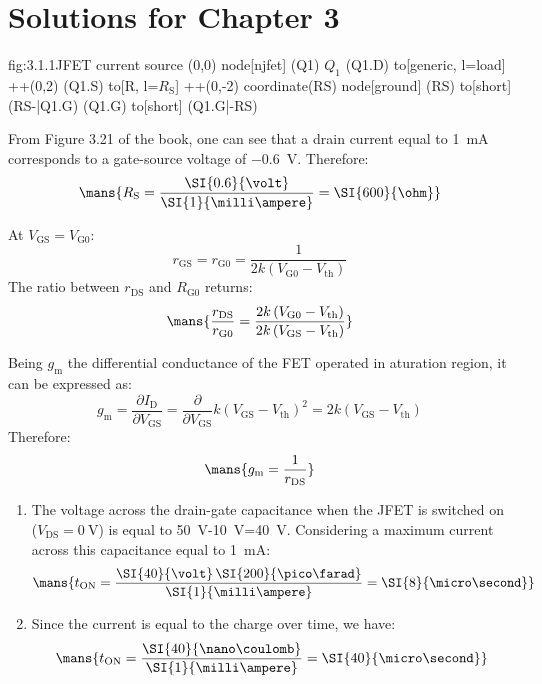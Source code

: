 \chapter{Solutions for Chapter 3}

\begin{circuit}{fig:3.1.1}{JFET current source}
    (0,0) node[njfet] (Q1) {$Q_1$}
    (Q1.D) to[generic, l=load] ++(0,2)
    (Q1.S) to[R, l=$R_\text{S}$] ++(0,-2) coordinate(RS)
    node[ground] {}
    (RS) to[short] (RS-|Q1.G)
    (Q1.G) to[short] (Q1.G|-RS)

\end{circuit}

From Figure 3.21 of the book, one can see that a drain current equal to \SI{1}{\milli\ampere} corresponds to a gate-source voltage of \SI{-0.6}{\volt}.
Therefore:
\[\mans{R_\text{S}=\frac{\SI{0.6}{\volt}}{\SI{1}{\milli\ampere}}=\SI{600}{\ohm}}\]

At $V_\text{GS}=V_\text{G0}$:
\[r_\text{GS}=r_\text{G0}=\frac{1}{2k\left(V_\text{G0}-V_\text{th}\right)}\]
The ratio between $r_\text{DS}$ and $R_\text{G0}$ returns:
\[\mans{\frac{r_\text{DS}}{r_\text{G0}}=\frac{2k\left(V_\text{G0}-V_\text{th}\right)}{2k\left(V_\text{GS}-V_\text{th}\right)}}\]

Being $g_\text{m}$ the differential conductance of the FET operated in aturation region, it can be expressed as:
\[g_\text{m}=\frac{\partial I_\text{D}}{\partial V_\text{GS}}=\frac{\partial}{\partial V_\text{GS}}k\left(V_\text{GS}-V_\text{th}\right)^2=2k\left(V_\text{GS}-V_\text{th}\right)\]
Therefore:
\[\mans{g_\text{m}=\frac{1}{r_\text{DS}}}\]

\begin{enumerate}
    \item The voltage across the drain-gate capacitance when the JFET is switched on ($V_\text{DS}=\SI{0}{\volt}$) is equal to \SI{50}{\volt}-\SI{10}{\volt}=\SI{40}{\volt}. Considering a maximum current across this capacitance equal to \SI{1}{\milli\ampere}:
    \[\mans{t_\text{ON}=\frac{\SI{40}{\volt}\,\SI{200}{\pico\farad}}{\SI{1}{\milli\ampere}}=\SI{8}{\micro\second}}\]
    \item Since the current is equal to the charge over time, we have:
    \[\mans{t_\text{ON}=\frac{\SI{40}{\nano\coulomb}}{\SI{1}{\milli\ampere}}=\SI{40}{\micro\second}}\]
\end{enumerate}
